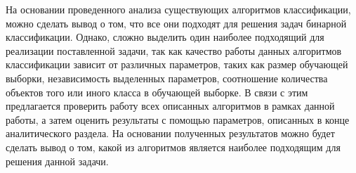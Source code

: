 На основании проведенного анализа существующих алгоритмов классификации, можно сделать вывод о том, что все они подходят для решения задач бинарной классификации. Однако, сложно выделить один наиболее подходящий для реализации поставленной задачи, так как качество работы данных алгоритмов классификации зависит от различных параметров, таких как размер обучающей выборки, независимость выделенных параметров, соотношение количества объектов того или иного класса в обучающей выборке. В связи с этим предлагается проверить работу всех описанных алгоритмов в рамках данной работы, а затем оценить результаты с помощью параметров, описанных в конце аналитического раздела. На основании полученных результатов можно будет сделать вывод о том, какой из алгоритмов является наиболее подходящим для решения данной задачи.
